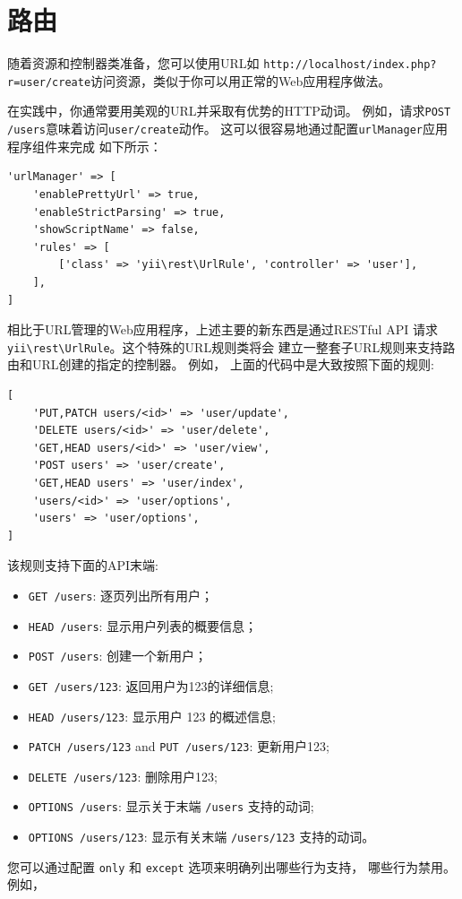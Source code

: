 \label{rest-routing.md}\section{路由}
随着资源和控制器类准备，您可以使用URL如
\lstinline|http://localhost/index.php?r=user/create|访问资源，类似于你可以用正常的Web应用程序做法。

在实践中，你通常要用美观的URL并采取有优势的HTTP动词。
例如，请求\lstinline|POST /users|意味着访问\lstinline|user/create|动作。
这可以很容易地通过配置\lstinline|urlManager|应用程序组件来完成
如下所示：

\lstset{language=php}\begin{lstlisting}
'urlManager' => [
    'enablePrettyUrl' => true,
    'enableStrictParsing' => true,
    'showScriptName' => false,
    'rules' => [
        ['class' => 'yii\rest\UrlRule', 'controller' => 'user'],
    ],
]
\end{lstlisting}
相比于URL管理的Web应用程序，上述主要的新东西是通过RESTful API
请求\texttt{yii{\allowbreak{}\textbackslash}rest{\allowbreak{}\textbackslash}UrlRule}。这个特殊的URL规则类将会
建立一整套子URL规则来支持路由和URL创建的指定的控制器。
例如， 上面的代码中是大致按照下面的规则:

\lstset{language=php}\begin{lstlisting}
[
    'PUT,PATCH users/<id>' => 'user/update',
    'DELETE users/<id>' => 'user/delete',
    'GET,HEAD users/<id>' => 'user/view',
    'POST users' => 'user/create',
    'GET,HEAD users' => 'user/index',
    'users/<id>' => 'user/options',
    'users' => 'user/options',
]
\end{lstlisting}
该规则支持下面的API末端:

\begin{itemize}
\item \lstinline|GET /users|: 逐页列出所有用户；
\item \lstinline|HEAD /users|: 显示用户列表的概要信息；
\item \lstinline|POST /users|: 创建一个新用户；
\item \lstinline|GET /users/123|: 返回用户为123的详细信息;
\item \lstinline|HEAD /users/123|: 显示用户 123 的概述信息;
\item \lstinline|PATCH /users/123| and \lstinline|PUT /users/123|: 更新用户123;
\item \lstinline|DELETE /users/123|: 删除用户123;
\item \lstinline|OPTIONS /users|: 显示关于末端 \lstinline|/users| 支持的动词;
\item \lstinline|OPTIONS /users/123|: 显示有关末端 \lstinline|/users/123| 支持的动词。
\end{itemize}
您可以通过配置 \lstinline|only| 和 \lstinline|except| 选项来明确列出哪些行为支持，
哪些行为禁用。例如，

